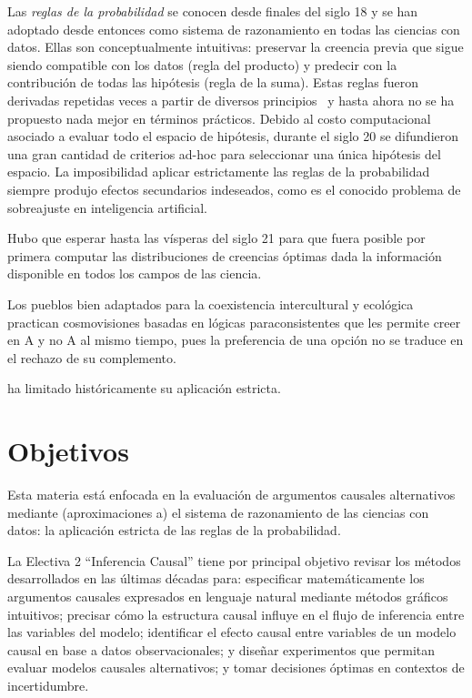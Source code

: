 \documentclass[11pt]{article}
\begin{document}

Las \emph{reglas de la probabilidad} se conocen desde finales del siglo 18 y se han adoptado desde entonces como sistema de razonamiento en todas las ciencias con datos.
Ellas son conceptualmente intuitivas: preservar la creencia previa que sigue siendo compatible con los datos (regla del producto) y predecir con la contribución de todas las hipótesis (regla de la suma).
Estas reglas fueron derivadas repetidas veces a partir de diversos principios~\cite{halpern2017-RAU2} y hasta ahora no se ha propuesto nada mejor en términos prácticos.
Debido al costo computacional asociado a evaluar todo el espacio de hipótesis, durante el siglo 20 se difundieron una gran cantidad de criterios ad-hoc para seleccionar una única hipótesis del espacio.
La imposibilidad aplicar estrictamente las reglas de la probabilidad siempre produjo efectos secundarios indeseados, como es el conocido problema de sobreajuste en inteligencia artificial.



Hubo que esperar hasta las vísperas del siglo 21 para que fuera posible por primera computar las distribuciones de creencias óptimas dada la información disponible en todos los campos de las ciencia.

Los pueblos bien adaptados para la coexistencia intercultural y ecológica practican cosmovisiones basadas en lógicas paraconsistentes que les permite creer en A y no A al mismo tiempo, pues la preferencia de una opción no se traduce en el rechazo de su complemento.

ha limitado históricamente su aplicación estricta.


\section{Objetivos}

\begin{mdframed}
Esta materia está enfocada en la evaluación de argumentos causales alternativos mediante (aproximaciones a) el sistema de razonamiento de las ciencias con datos: la aplicación estricta de las reglas de la probabilidad.
\end{mdframed}


La Electiva 2 ``Inferencia Causal'' tiene por principal objetivo revisar los métodos desarrollados en las últimas décadas para: especificar matemáticamente los argumentos causales expresados en lenguaje natural mediante métodos gráficos intuitivos; precisar cómo la estructura causal influye en el flujo de inferencia entre las variables del modelo; identificar el efecto causal entre variables de un modelo causal en base a datos observacionales; y diseñar experimentos que permitan evaluar modelos causales alternativos; y tomar decisiones óptimas en contextos de incertidumbre.
\end{document}
